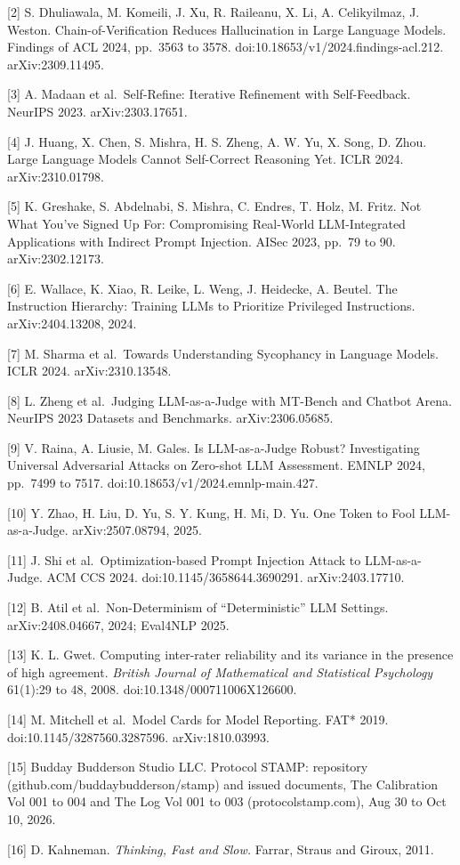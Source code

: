 \documentclass[
  11pt,
]{article}
\begin{document}
{[}2{]} S. Dhuliawala, M. Komeili, J. Xu, R. Raileanu, X. Li, A.
Celikyilmaz, J. Weston. Chain-of-Verification Reduces Hallucination in
Large Language Models. Findings of ACL 2024, pp.~3563 to 3578.
doi:10.18653/v1/2024.findings-acl.212. arXiv:2309.11495.

{[}3{]} A. Madaan et al.~Self-Refine: Iterative Refinement with
Self-Feedback. NeurIPS 2023. arXiv:2303.17651.

{[}4{]} J. Huang, X. Chen, S. Mishra, H. S. Zheng, A. W. Yu, X. Song, D.
Zhou. Large Language Models Cannot Self-Correct Reasoning Yet. ICLR
2024. arXiv:2310.01798.

{[}5{]} K. Greshake, S. Abdelnabi, S. Mishra, C. Endres, T. Holz, M.
Fritz. Not What You've Signed Up For: Compromising Real-World
LLM-Integrated Applications with Indirect Prompt Injection. AISec 2023,
pp.~79 to 90. arXiv:2302.12173.

{[}6{]} E. Wallace, K. Xiao, R. Leike, L. Weng, J. Heidecke, A. Beutel.
The Instruction Hierarchy: Training LLMs to Prioritize Privileged
Instructions. arXiv:2404.13208, 2024.

{[}7{]} M. Sharma et al.~Towards Understanding Sycophancy in Language
Models. ICLR 2024. arXiv:2310.13548.

{[}8{]} L. Zheng et al.~Judging LLM-as-a-Judge with MT-Bench and Chatbot
Arena. NeurIPS 2023 Datasets and Benchmarks. arXiv:2306.05685.

{[}9{]} V. Raina, A. Liusie, M. Gales. Is LLM-as-a-Judge Robust?
Investigating Universal Adversarial Attacks on Zero-shot LLM Assessment.
EMNLP 2024, pp.~7499 to 7517. doi:10.18653/v1/2024.emnlp-main.427.

{[}10{]} Y. Zhao, H. Liu, D. Yu, S. Y. Kung, H. Mi, D. Yu. One Token to
Fool LLM-as-a-Judge. arXiv:2507.08794, 2025.

{[}11{]} J. Shi et al.~Optimization-based Prompt Injection Attack to
LLM-as-a-Judge. ACM CCS 2024. doi:10.1145/3658644.3690291.
arXiv:2403.17710.

{[}12{]} B. Atil et al.~Non-Determinism of ``Deterministic'' LLM
Settings. arXiv:2408.04667, 2024; Eval4NLP 2025.

{[}13{]} K. L. Gwet. Computing inter-rater reliability and its variance
in the presence of high agreement. \emph{British Journal of Mathematical
and Statistical Psychology} 61(1):29 to 48, 2008.
doi:10.1348/000711006X126600.

{[}14{]} M. Mitchell et al.~Model Cards for Model Reporting. FAT* 2019.
doi:10.1145/3287560.3287596. arXiv:1810.03993.

{[}15{]} Budday Budderson Studio LLC. Protocol STAMP: repository
(github.com/buddaybudderson/stamp) and issued documents, The Calibration
Vol 001 to 004 and The Log Vol 001 to 003 (protocolstamp.com), Aug 30 to
Oct 10, 2026.

{[}16{]} D. Kahneman. \emph{Thinking, Fast and Slow.} Farrar, Straus and
Giroux, 2011.
\end{document}
